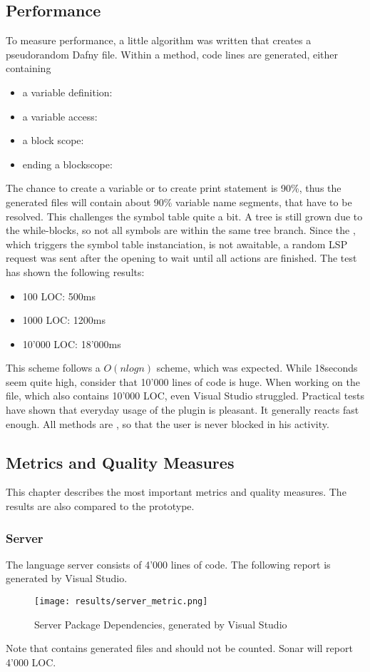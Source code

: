 \subsection{Performance}
To measure performance, a little algorithm was written that creates a pseudorandom Dafny file.
Within a method, code lines are generated, either containing
\begin{itemize}
    \item a variable definition: 
    \item a variable access: 
    \item a block scope: 
    \item ending a blockscope: \code{\}}
\end{itemize}
The chance to create a variable or to create print statement is 90\%, thus the generated files will contain about 90\% variable name segments, that have to be resolved.
This challenges the symbol table quite a bit.
A tree is still grown due to the while-blocks, so not all symbols are within the same tree branch.
Since the , which triggers the symbol table instanciation, is not awaitable, a random LSP request was sent after the opening to wait until all actions are finished.
The test has shown the following results:

\begin{itemize}
    \item 100 LOC: 500ms
    \item 1000 LOC: 1200ms
    \item 10'000 LOC: 18'000ms
\end{itemize}

This scheme follows a $O(nlogn)$ scheme, which was expected.
While 18seconds seem quite high, consider that 10'000 lines of code is huge.
When working on the  file, which also contains 10'000 LOC, even Visual Studio struggled.
Practical tests have shown that everyday usage of the plugin is pleasant.
It generally reacts fast enough.
All methods are , so that the user is never blocked in his activity.

\subsection{Metrics and Quality Measures}
This chapter describes the most important metrics and quality measures.
The results are also compared to the prototype.

\subsubsection{Server}
The language server consists of 4'000 lines of code. The following report is generated by Visual Studio.
\begin{figure}[H]
    \centering
    \texttt{[image: results/server\_metric.png]}
    \caption{Server Package Dependencies, generated by Visual Studio}
    \label{fig:dependency_graph}
\end{figure}
Note that  contains generated files and should not be counted.
Sonar will report 4'000 LOC.

